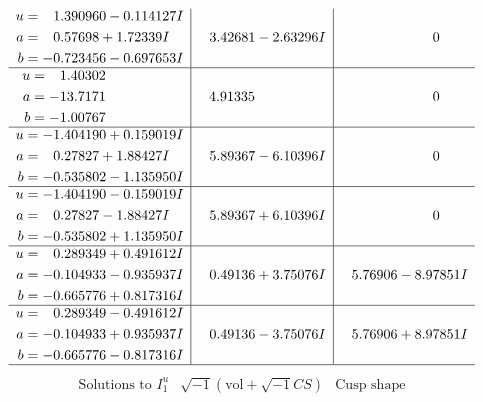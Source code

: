 \documentclass[1p]{elsarticle_modified}
\theoremstyle{definition}
\newcommand{\I}{\sqrt{-1}}
\begin{document}
$$\begin{array}{c|c|c}
\begin{aligned}
u &= \phantom{-}1.390960 - 0.114127 I \\
a &= \phantom{-}0.57698 + 1.72339 I \\
b &= -0.723456 - 0.697653 I\end{aligned}
 & \phantom{-}3.42681 - 2.63296 I & \phantom{-0.000000 } 0 \\ \hline\begin{aligned}
u &= \phantom{-}1.40302\phantom{ +0.000000I} \\
a &= -13.7171\phantom{ +0.000000I} \\
b &= -1.00767\phantom{ +0.000000I}\end{aligned}
 & \phantom{-}4.91335\phantom{ +0.000000I} & \phantom{-0.000000 } 0 \\ \hline\begin{aligned}
u &= -1.404190 + 0.159019 I \\
a &= \phantom{-}0.27827 + 1.88427 I \\
b &= -0.535802 - 1.135950 I\end{aligned}
 & \phantom{-}5.89367 - 6.10396 I & \phantom{-0.000000 } 0 \\ \hline\begin{aligned}
u &= -1.404190 - 0.159019 I \\
a &= \phantom{-}0.27827 - 1.88427 I \\
b &= -0.535802 + 1.135950 I\end{aligned}
 & \phantom{-}5.89367 + 6.10396 I & \phantom{-0.000000 } 0 \\ \hline\begin{aligned}
u &= \phantom{-}0.289349 + 0.491612 I \\
a &= -0.104933 - 0.935937 I \\
b &= -0.665776 + 0.817316 I\end{aligned}
 & \phantom{-}0.49136 + 3.75076 I & \phantom{-}5.76906 - 8.97851 I \\ \hline\begin{aligned}
u &= \phantom{-}0.289349 - 0.491612 I \\
a &= -0.104933 + 0.935937 I \\
b &= -0.665776 - 0.817316 I\end{aligned}
 & \phantom{-}0.49136 - 3.75076 I & \phantom{-}5.76906 + 8.97851 I\\
 \hline 
 \end{array}$$\newpage$$\begin{array}{c|c|c}  
\text{Solutions to }I^u_{1}& \I (\text{vol} + \sqrt{-1}CS) & \text{Cusp shape}\\

\end{array}$$
\end{document}
